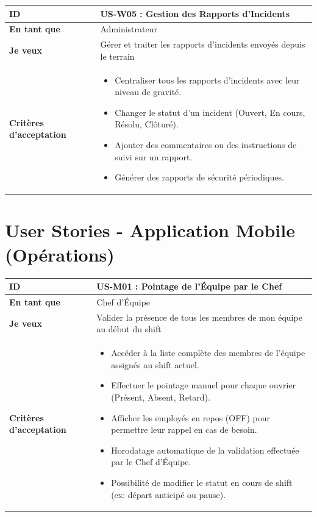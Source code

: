 \documentclass[12pt,a4paper]{article}
\begin{document}
\begin{longtable}{|p{3cm}|p{12cm}|}
\hline
\textbf{ID} & \textbf{US-W05 : Gestion des Rapports d'Incidents} \\ \hline
\textbf{En tant que} & Administrateur \\ \hline
\textbf{Je veux} & Gérer et traiter les rapports d'incidents envoyés depuis le terrain \\ \hline
\textbf{Critères d'acceptation} & 
\begin{itemize}[nosep, leftmargin=*]
    \item Centraliser tous les rapports d'incidents avec leur niveau de gravité.
    \item Changer le statut d'un incident (Ouvert, En cours, Résolu, Clôturé).
    \item Ajouter des commentaires ou des instructions de suivi sur un rapport.
    \item Générer des rapports de sécurité périodiques.
\end{itemize} \\ \hline
\end{longtable}

\section{User Stories - Application Mobile (Opérations)}

\begin{longtable}{|p{3cm}|p{12cm}|}
\hline
\textbf{ID} & \textbf{US-M01 : Pointage de l'Équipe par le Chef} \\ \hline
\textbf{En tant que} & Chef d'Équipe \\ \hline
\textbf{Je veux} & Valider la présence de tous les membres de mon équipe au début du shift \\ \hline
\textbf{Critères d'acceptation} & 
\begin{itemize}[nosep, leftmargin=*]
    \item Accéder à la liste complète des membres de l'équipe assignés au shift actuel.
    \item Effectuer le pointage manuel pour chaque ouvrier (Présent, Absent, Retard).
    \item Afficher les employés en repos (OFF) pour permettre leur rappel en cas de besoin.
    \item Horodatage automatique de la validation effectuée par le Chef d'Équipe.
    \item Possibilité de modifier le statut en cours de shift (ex: départ anticipé ou pause).
\end{itemize} \\ \hline
\end{longtable}
\end{document}
